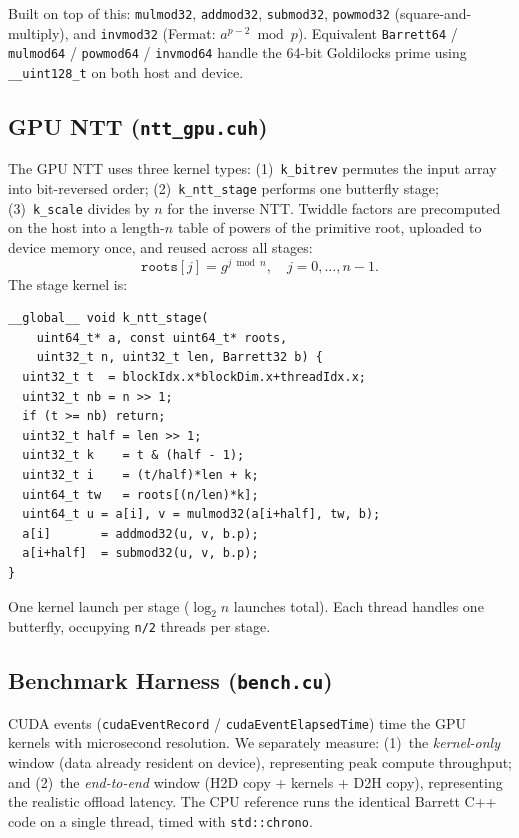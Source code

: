 \documentclass[conference]{IEEEtran}
\begin{document}
\noindent Built on top of this: \texttt{mulmod32}, \texttt{addmod32}, \texttt{submod32},
\texttt{powmod32} (square-and-multiply), and \texttt{invmod32} (Fermat: $a^{p-2} \bmod p$).
Equivalent \texttt{Barrett64} / \texttt{mulmod64} / \texttt{powmod64} / \texttt{invmod64} handle
the 64-bit Goldilocks prime using \texttt{\_\_uint128\_t} on both host and device.

\subsection{GPU NTT (\texttt{ntt\_gpu.cuh})}

The GPU NTT uses three kernel types: (1)~\texttt{k\_bitrev} permutes the input array into
bit-reversed order; (2)~\texttt{k\_ntt\_stage} performs one butterfly stage; (3)~\texttt{k\_scale}
divides by $n$ for the inverse NTT. Twiddle factors are precomputed on the host into a length-$n$
table of powers of the primitive root, uploaded to device memory once, and reused across all stages:
$$\texttt{roots}[j] = g^{j \bmod n}, \quad j = 0, \ldots, n-1.$$
The stage kernel is:
\begin{lstlisting}
__global__ void k_ntt_stage(
    uint64_t* a, const uint64_t* roots,
    uint32_t n, uint32_t len, Barrett32 b) {
  uint32_t t  = blockIdx.x*blockDim.x+threadIdx.x;
  uint32_t nb = n >> 1;
  if (t >= nb) return;
  uint32_t half = len >> 1;
  uint32_t k    = t & (half - 1);
  uint32_t i    = (t/half)*len + k;
  uint64_t tw   = roots[(n/len)*k];
  uint64_t u = a[i], v = mulmod32(a[i+half], tw, b);
  a[i]       = addmod32(u, v, b.p);
  a[i+half]  = submod32(u, v, b.p);
}
\end{lstlisting}
\noindent One kernel launch per stage ($\log_2 n$ launches total). Each thread handles one
butterfly, occupying \texttt{n/2} threads per stage.

\subsection{Benchmark Harness (\texttt{bench.cu})}

CUDA events (\texttt{cudaEventRecord} / \texttt{cudaEventElapsedTime}) time the GPU kernels with
microsecond resolution. We separately measure: (1)~the \emph{kernel-only} window (data already
resident on device), representing peak compute throughput; and (2)~the \emph{end-to-end} window
(H2D copy + kernels + D2H copy), representing the realistic offload latency. The CPU reference
runs the identical Barrett C++ code on a single thread, timed with \texttt{std::chrono}.
\end{document}

